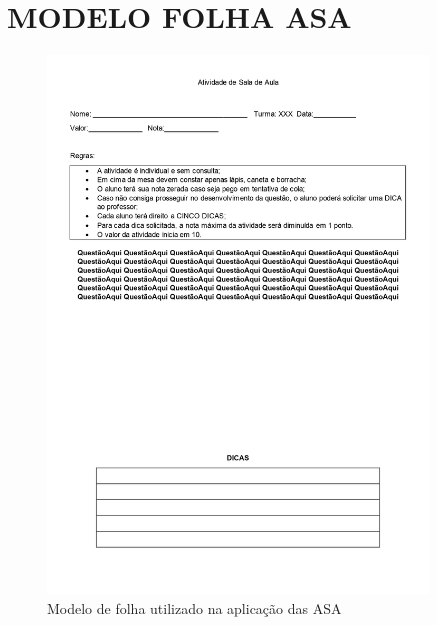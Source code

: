 \chapter{MODELO FOLHA ASA} \label{ch:modeloASA}
\begin{figure}[htb]
  \centering
  \includegraphics[width=0.9\textwidth]{fig/modeloASA_pages-to-jpg-0001.jpg}
  \caption{Modelo de folha utilizado na aplicação das ASA}
  \label{fig:figura}
\end{figure}